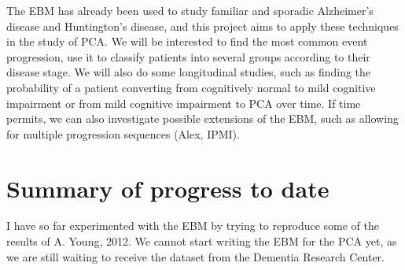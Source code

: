 \documentclass[11pt,a4paper,oneside]{report}
\begin{document}
The EBM has already been used to study familiar and sporadic Alzheimer's disease and Huntington's disease, and this project aims to apply these techniques in the study of PCA. We will be interested to find the most common event progression, use it to classify patients into several groups according to their disease stage. We will also do some longitudinal studies, such as finding the probability of a patient converting from cognitively normal to mild cognitive impairment or from mild cognitive impairment to PCA over time. If time permits, we can also investigate possible extensions of the EBM, such as allowing for multiple progression sequences (Alex, IPMI).

\section*{Summary of progress to date}

I have so far experimented with the EBM by trying to reproduce some of the results of A. Young, 2012. We cannot start writing the EBM for the PCA yet, as we are still waiting to receive the dataset from the Dementia Research Center.
\end{document}
